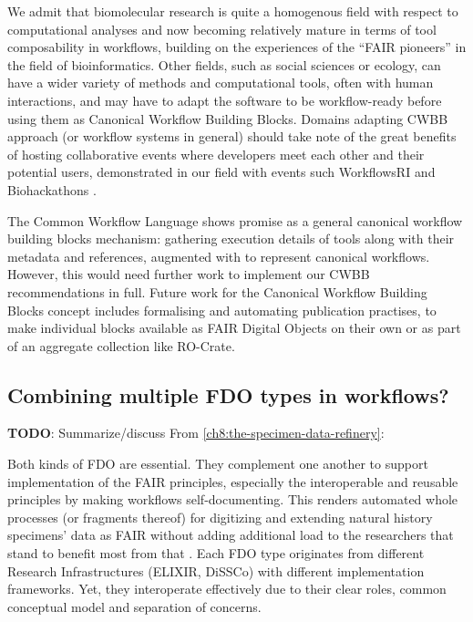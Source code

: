 We admit that biomolecular research is quite a homogenous field with
respect to computational analyses and now becoming relatively mature in
terms of tool composability in workflows, building on the experiences of
the ``FAIR pioneers'' in the field of bioinformatics. Other fields, such
as social sciences or ecology, can have a wider variety of methods and
computational tools, often with human interactions, and may have to
adapt the software to be workflow-ready \cite{ch6-37} before using them as
Canonical Workflow Building Blocks. Domains adapting CWBB approach (or
workflow systems in general) should take note of the great benefits of
hosting collaborative events where developers meet each other and their
potential users, demonstrated in our field with events such WorkflowsRI
\cite{ch6-39} and Biohackathons \cite{ch6-40}.

The Common Workflow Language shows promise as a general canonical
workflow building blocks mechanism: gathering execution details of tools
along with their metadata and references, augmented with
 to represent canonical workflows. However, this would need
further work to implement our CWBB recommendations in full. Future work
for the Canonical Workflow Building Blocks concept includes formalising
and automating publication practises, to make individual blocks
available as FAIR Digital Objects on their own or as part of an
aggregate collection like RO-Crate.



\subsection{Combining multiple FDO types in workflows?}

\textbf{TODO}: Summarize/discuss 
From \vref{ch8:the-specimen-data-refinery}:



Both kinds of FDO are essential. They complement one another to support
implementation of the FAIR principles, especially the interoperable and
reusable principles by making workflows self-documenting. This renders
automated whole processes (or fragments thereof) for digitizing and
extending natural history specimens' data as FAIR without adding
additional load to the researchers that stand to benefit most from that
\cite{ch8-27}. Each FDO type originates from different Research
Infrastructures (ELIXIR, DiSSCo) with different implementation
frameworks. Yet, they interoperate effectively due to their clear roles,
common conceptual model and separation of concerns.


